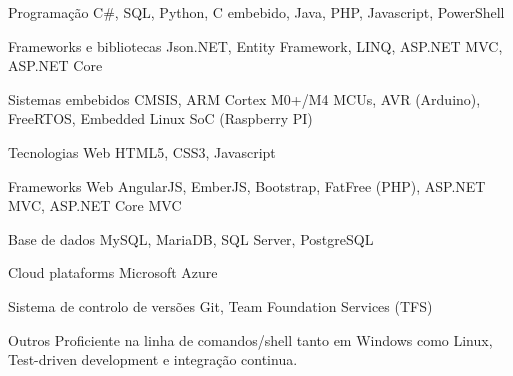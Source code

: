 


\begin{cvskills}


\cvskill
{Programação}
{C\#, SQL, Python, C embebido, Java, PHP, Javascript, PowerShell}


\cvskill
{Frameworks e bibliotecas}
{Json.NET, Entity Framework, LINQ, ASP.NET MVC, ASP.NET Core}

\cvskill
{Sistemas embebidos}
{CMSIS, ARM Cortex M0+/M4 MCUs, AVR (Arduino),
\newline FreeRTOS, Embedded Linux SoC (Raspberry PI)}


\cvskill
{Tecnologias Web}
{HTML5, CSS3, Javascript}


\cvskill
{Frameworks Web}
{AngularJS, EmberJS, Bootstrap,
\newline FatFree (PHP), ASP.NET MVC, ASP.NET Core MVC}


\cvskill
{Base de dados}
{MySQL, MariaDB, SQL Server, PostgreSQL}


\cvskill
{Cloud plataforms}
{Microsoft Azure}


\cvskill
{Sistema de controlo de versões}
{Git, Team Foundation Services (TFS)}


\cvskill
{Outros}
{Proficiente na linha de comandos/shell tanto em Windows como Linux, 
\newline
Test-driven development e integração continua.}


\end{cvskills}
